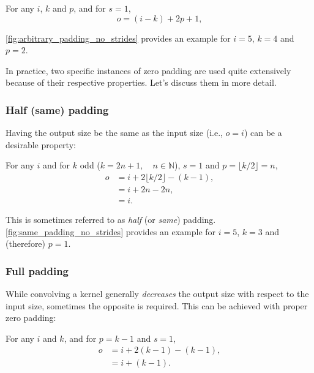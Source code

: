 \begin{relationship}\label{rel:arbitrary_padding_no_strides}
For any $i$, $k$ and $p$, and for $s = 1$,
\begin{equation*}
    o = (i - k) + 2p + 1,
\end{equation*}
\end{relationship}

\noindent \autoref{fig:arbitrary_padding_no_strides} provides an example for $i
= 5$, $k = 4$ and $p = 2$.

In practice, two specific instances of zero padding are used quite extensively
because of their respective properties. Let's discuss them in more detail.

\subsubsection{Half (same) padding}

Having the output size be the same as the input size (i.e., $o = i$) can be a
desirable property:

\begin{relationship}\label{rel:same_padding_no_strides}
For any $i$ and for $k$ odd ($k = 2n + 1, \quad n \in \mathbb{N}$), $s = 1$ and
$p = \lfloor k / 2 \rfloor = n$,
\begin{equation*}
\begin{split}
    o &= i + 2 \lfloor k / 2 \rfloor - (k - 1) ,\\
      &= i + 2n - 2n ,\\
      &= i.
\end{split}
\end{equation*}
\end{relationship}

\noindent This is sometimes referred to as {\em half\/} (or {\em same\/})
padding. \autoref{fig:same_padding_no_strides} provides an example for
$i = 5$, $k = 3$ and (therefore) $p = 1$.

\subsubsection{Full padding}

While convolving a kernel generally {\em decreases\/} the output size with
respect to the input size, sometimes the opposite is required. This can be
achieved with proper zero padding:

\begin{relationship}\label{rel:full_padding_no_strides}
For any $i$ and $k$, and for $p = k - 1$ and $s = 1$,
\begin{equation*}
\begin{split}
    o &= i + 2(k - 1) - (k - 1) ,\\
      &= i + (k - 1).
\end{split}
\end{equation*}
\end{relationship}

